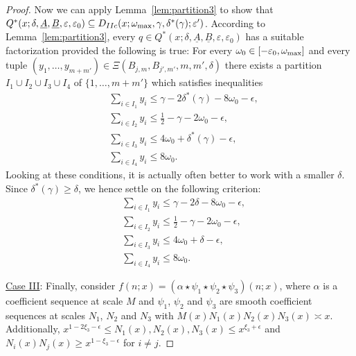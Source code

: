\documentclass{amsart}
\numberwithin{equation}{section}
\begin{document}
\begin{proof}
  Now we can apply Lemma~\ref{lem:partition3} to show that $  Q^*(x;\delta,\underline{A},\underline{B},\varepsilon,\varepsilon_0) \subseteq  D_{IIc}(x;\omega_{\begin{scriptsize}
\mbox{max}
\end{scriptsize}},\gamma,\delta^*(\gamma);\varepsilon')$.   According to Lemma~\ref{lem:partition3}, every $q \in Q^*(x;\delta,\underline{A},\underline{B},\varepsilon,\varepsilon_0)$ has a suitable factorization provided the following is true:
For every  $\omega_0 \in [ -\varepsilon_0, \omega_{\begin{scriptsize}
\mbox{max}\end{scriptsize}}]$  and every  tuple $(y_1, \dots, y_{m+m'}) \in \Xi(B_{j,m},B_{j',m'},m,m',\delta)$  there exists a   partition $I_1 \cup I_2 \cup I_3 \cup I_4 $ of $\{1, \dots, m+m'\}$ which satisfies inequalities
\begin{align*}
&\sum_{i \in I_1} y_i \leq   \gamma-2\delta^*(\gamma)      -    8\omega_0    -\epsilon, \\
  &\sum_{i \in I_2} y_i \leq  \frac{1}{2}-\gamma- 2\omega_0 -\epsilon, \\
   &\sum_{i \in I_3} y_i \leq  4\omega_0   +\delta^*(\gamma)   -\epsilon ,\\
    &\sum_{i \in I_4} y_i \leq   8\omega_0.
\end{align*} 
Looking at these conditions, it is actually often better to work with a smaller $\delta$. Since $\delta^*(\gamma) \geq \delta$, we hence settle on the following criterion:
\begin{align*}
&\sum_{i \in I_1} y_i \leq   \gamma-2\delta       -    8\omega_0    -\epsilon, \\
  &\sum_{i \in I_2} y_i \leq  \frac{1}{2}-\gamma- 2\omega_0 -\epsilon, \\
   &\sum_{i \in I_3} y_i \leq  4\omega_0   +\delta    -\epsilon ,\\
    &\sum_{i \in I_4} y_i \leq   8\omega_0.
\end{align*} 

\medskip
\underline{Case III}: Finally, consider $f(n;x) = (\alpha \star \psi_1 \star \psi_2 \star \psi_3)(n;x)$, where $\alpha$ is a coefficient sequence at scale $M$ and $\psi_1$, $\psi_2$ and $\psi_3$ are   smooth  coefficient sequences at scales $N_1$, $N_2$ and $N_3$ with $M(x) N_1(x) N_2(x) N_3(x) \asymp x$.   Additionally, $x^{1-2\xi_3-\epsilon} \leq N_1(x), N_2(x), N_3(x) \leq x^{\xi_3+\epsilon}$ and $N_i(x)N_j(x) \geq x^{1-\xi_3-\epsilon}$ for $i \neq j$.


\end{proof}
\end{document}
